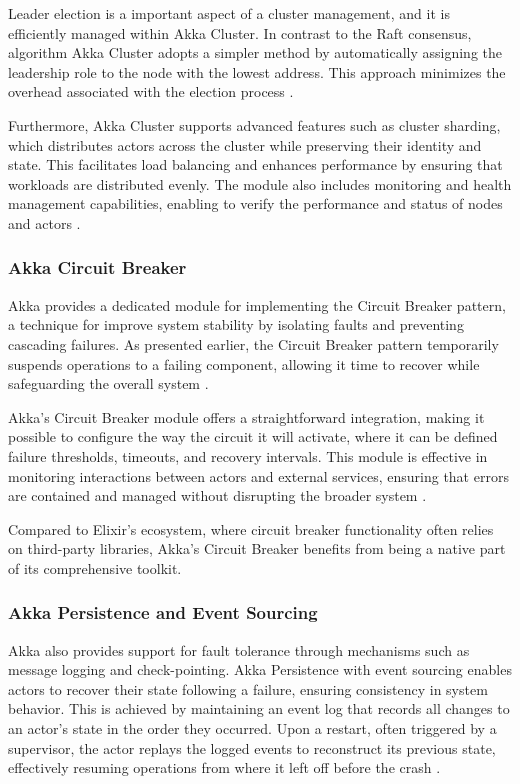 Leader election is a important aspect of a cluster management, and it is efficiently managed within Akka Cluster. In contrast to the Raft consensus, algorithm Akka Cluster adopts a simpler method by automatically assigning the leadership role to the node with the lowest address. This approach minimizes the overhead associated with the election process \cite{raft-diego,akka-docs}.

Furthermore, Akka Cluster supports advanced features such as cluster sharding, which distributes actors across the cluster while preserving their identity and state. This facilitates load balancing and enhances performance by ensuring that workloads are distributed evenly. The module also includes monitoring and health management capabilities, enabling to verify the performance and status of nodes and actors \cite{Abraham2023}.

\subsubsection{Akka Circuit Breaker}

Akka provides a dedicated module for implementing the Circuit Breaker pattern, a technique for improve system stability by isolating faults and preventing cascading failures. As presented earlier, the Circuit Breaker pattern temporarily suspends operations to a failing component, allowing it time to recover while safeguarding the overall system \cite{fowler-circuit-breakers}.

Akka’s Circuit Breaker module offers a straightforward integration, making it possible to configure the way the circuit it will activate, where it can be defined failure thresholds, timeouts, and recovery intervals. This module is effective in monitoring interactions between actors and external services, ensuring that errors are contained and managed without disrupting the broader system \cite{akka-docs}.

Compared to Elixir’s ecosystem, where circuit breaker functionality often relies on third-party libraries, Akka’s Circuit Breaker benefits from being a native part of its comprehensive toolkit.

\subsubsection{Akka Persistence and Event Sourcing}

Akka also provides support for fault tolerance through mechanisms such as message logging and check-pointing. Akka Persistence with event sourcing enables actors to recover their state following a failure, ensuring consistency in system behavior. This is achieved by maintaining an event log that records all changes to an actor’s state in the order they occurred. Upon a restart, often triggered by a supervisor, the actor replays the logged events to reconstruct its previous state, effectively resuming operations from where it left off before the crash \cite{akka-docs}.

